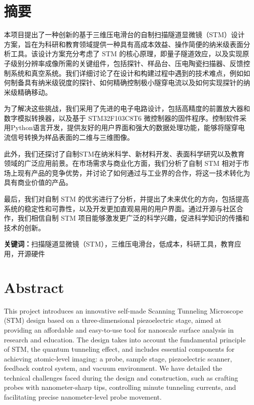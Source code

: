 \documentclass{article}
\begin{document}
\begin{spacing}{1.625}
\xiaosi


\section*{摘要}
	本项目提出了一种创新的基于三维压电滑台的自制扫描隧道显微镜（STM）设计方案，旨在为科研和教育领域提供一种具有高成本效益、操作简便的纳米级表面分析工具。该设计方案充分考虑了 STM 的核心原理，即量子隧道效应，以及实现原子级别分辨率成像所需的关键组件，包括探针、样品台、压电陶瓷扫描器、反馈控制系统和真空系统。我们详细讨论了在设计和构建过程中遇到的技术难点，例如如何制备具有纳米级锐度的探针、如何精确控制极小隧穿电流以及如何实现探针的纳米级精确移动。
	
	为了解决这些挑战，我们采用了先进的电子电路设计，包括高精度的前置放大器和数字模拟转换器，以及基于 STM32F103C8T6 微控制器的固件程序。控制软件采用Python语言开发，提供友好的用户界面和强大的数据处理功能，能够将隧穿电流信号转换为样品表面的二维与三维图像。
	
	此外，我们还探讨了自制STM在纳米科学、新材料开发、表面科学研究以及教育领域的广泛应用前景。在市场需求与商业化方面，我们分析了自制 STM 相对于市场上现有产品的竞争优势，并讨论了如何通过与工业界的合作，将这一技术转化为具有商业价值的产品。
	
	最后，我们对自制 STM 的优劣进行了分析，并提出了未来优化的方向，包括提高系统的稳定性和可靠性，以及开发更加直观易用的用户界面。通过开源与社区合作，我们相信自制 STM 项目能够激发更广泛的科学兴趣，促进科学知识的传播和技术的创新。
	
	\textbf{关键词：}扫描隧道显微镜（STM），三维压电滑台，低成本，科研工具，教育应用，开源硬件



\newpage
\section*{\textbf{Abstract}} %
	\begin{adjustwidth}{0.42cm}{0.42cm}		
		This project introduces an innovative self-made Scanning Tunneling Microscope (STM) design based on a three-dimensional piezoelectric stage, aimed at providing an affordable and easy-to-use tool for nanoscale surface analysis in research and education. The design takes into account the fundamental principle of STM, the quantum tunneling effect, and includes essential components for achieving atomic-level imaging: a probe, sample stage, piezoelectric scanner, feedback control system, and vacuum environment. We have detailed the technical challenges faced during the design and construction, such as crafting probes with nanometer-sharp tips, controlling minute tunneling currents, and facilitating precise nanometer-level probe movement.
		

\end{adjustwidth}
\end{spacing}
\end{document}
